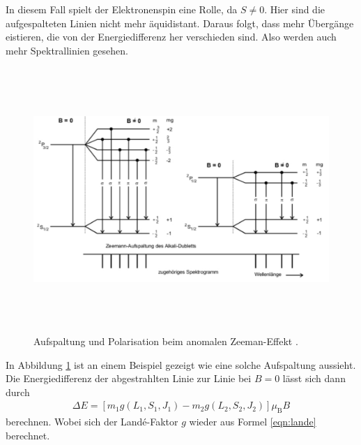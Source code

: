 In diesem Fall spielt der Elektronenspin eine Rolle, da $S\neq 0$. Hier sind die aufgespalteten Linien nicht mehr äquidistant. Daraus folgt, dass mehr Übergänge eistieren, die von der Energiedifferenz her verschieden sind. Also werden auch mehr Spektrallinien gesehen.
\begin{figure}
  \centering
  \includegraphics[height=10cm]{besuchInDerNacktmullAufzuchtstation/anomal.pdf}
  \caption{Aufspaltung und Polarisation beim anomalen Zeeman-Effekt \cite{anleitung}.}
  \label{fig:anomal}
\end{figure}
In Abbildung \ref{fig:anomal} ist an einem Beispiel gezeigt wie eine solche Aufspaltung aussieht.
Die Energiedifferenz der abgestrahlten Linie zur Linie bei $B = 0$ lässt sich dann durch
\begin{align}
  \Delta E = [m_1 g(L_1, S_1, J_1) - m_2 g(L_2, S_2, J_2)]\mu_\text{B} B
\end{align}
berechnen. Wobei sich der Landé-Faktor $g$ wieder aus Formel \eqref{eqn:lande} berechnet.
%
%
%
%


\cite{anleitung}
